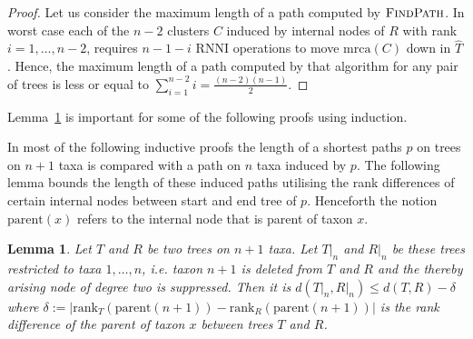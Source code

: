 \documentclass{amsart}
\newcommand{\parent}{\mathrm{parent}}
\newcommand{\mrca}{\mathrm{mrca}}
\newcommand{\rank}{\mathrm{rank}}
\newcommand{\rnni}{\mathrm{RNNI}}
\newcommand{\findpath}{\textsc{FindPath}}
\newtheorem{lemma}[definition]{Lemma}
\begin{document}
\begin{proof}
    Let us consider the maximum length of a path computed by $\findpath$.
    In worst case each of the $n-2$ clusters $C$ induced by internal nodes of $R$ with rank $i = 1, \dots, n-2$, requires $n-1-i$ $\rnni$ operations to move $\mrca(C)$ down in $\hat{T}$.
	Hence, the maximum length of a path computed by that algorithm for any pair of trees is less or equal to $\sum\limits_{i = 1}^{n-2} i = \frac{(n-2)(n-1)}{2}$.
\end{proof}

Lemma~\ref{lemma:distance_delete_taxon} is important for some of the following proofs using induction.

In most of the following inductive proofs the length of a shortest paths $p$ on trees on $n+1$ taxa is compared with a path on $n$ taxa induced by $p$.
The following lemma bounds the length of these induced paths utilising the rank differences of certain internal nodes between start and end tree of $p$.
Henceforth the notion $\parent(x)$ refers to the internal node that is parent of taxon $x$.

\begin{lemma}
    Let $T$ and $R$ be two trees on $n+1$ taxa.
    Let $T{\big|}_n$ and $R{\big|}_n$ be these trees restricted to taxa $1, \ldots, n$, i.e. taxon $n+1$ is deleted from $T$ and $R$ and the thereby arising node of degree two is suppressed.
    Then it is $d(T{\big|}_n, R{\big|}_n) \leq d(T,R) - \delta$ where $\delta:= |\rank_T(\parent(n+1)) - \rank_R(\parent(n+1))|$ is the rank difference of the parent of taxon $x$ between trees $T$ and $R$.
    \label{lemma:distance_delete_taxon}
\end{lemma}
\end{document}
